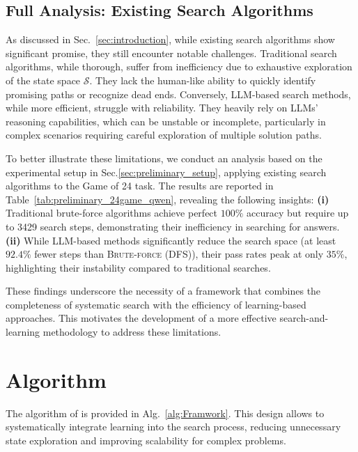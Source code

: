 \subsection{Full Analysis: Existing Search Algorithms}
\label{appendix:analysis_existing_search_appendix}
As discussed in Sec.~\ref{sec:introduction}, while existing search algorithms show significant promise, they still encounter notable challenges. Traditional search algorithms, while thorough, suffer from inefficiency due to exhaustive exploration of the state space $\mathcal{S}$. They lack the human-like ability to quickly identify promising paths or recognize dead ends. Conversely, LLM-based search methods, while more efficient, struggle with reliability. They heavily rely on LLMs' reasoning capabilities, which can be unstable or incomplete, particularly in complex scenarios requiring careful exploration of multiple solution paths.

To better illustrate these limitations, we conduct an analysis based on the experimental setup in Sec.\ref{sec:preliminary_setup}, applying existing search algorithms to the Game of 24 task.
The results are reported in Table~\ref{tab:preliminary_24game_qwen}, revealing the following insights: \textbf{(i)} Traditional brute-force algorithms achieve perfect $100\%$ accuracy but require up to \num{3429} search steps, demonstrating their inefficiency in searching for answers.
\textbf{(ii)} While LLM-based methods significantly reduce the search space (at least $92.4\%$ fewer steps than \textsc{Brute-force (DFS)}), their pass rates peak at only $35\%$, highlighting their instability compared to traditional searches.

These findings underscore the necessity of a framework that combines the completeness of systematic search with the efficiency of learning-based approaches. This motivates the development of a more effective search-and-learning methodology to address these limitations.

\section{Algorithm}
\label{appendix:algorithm_full}
The algorithm of \method is provided in Alg.~\ref{alg:Framwork}.  This design allows \method{} to systematically integrate learning into the search process, reducing unnecessary state exploration and improving scalability for complex problems.

